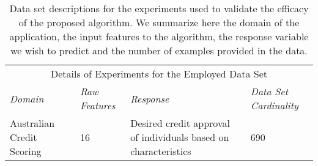 \documentclass{article}%
\begin{document}
%
\normalsize%
\begin{table}[H]
    \centering
    \scriptsize
    \begin{tabular}{|p{3cm}|p{3cm}|p{4cm}|p{3cm}|}
      \hline
      \hline
      \multicolumn{4}{c}{Details of Experiments for the Employed Data Set}\\
      \cline{1-4}
      \emph{Domain} & \emph{Raw Features} & \emph{Response} & \emph{Data Set Cardinality}\\
      \hline
      Australian Credit Scoring & 16 & Desired credit approval of individuals based on characteristics & 690\\\hline
    \end{tabular}
    \caption{\small Data set descriptions for the experiments used to validate the efficacy of the proposed algorithm. We summarize here the domain of the application, the input features to the algorithm, the response variable we wish to predict and the number of examples provided in the data.}
  \end{table}%
\end{document}

